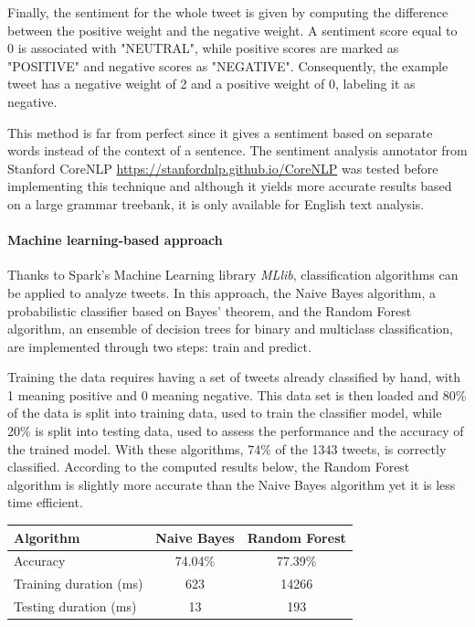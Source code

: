 \documentclass[11pt]{article}
\begin{document}
Finally, the sentiment for the whole tweet is given by computing the difference between the positive weight and the negative weight. A sentiment score equal to 0 is associated with "NEUTRAL", while positive scores are marked as "POSITIVE" and negative scores as "NEGATIVE". Consequently, the example tweet has a negative weight of 2 and a positive weight of 0, labeling it as negative.

This method is far from perfect since it gives a sentiment based on separate words instead of the context of a sentence. The sentiment analysis annotator from Stanford CoreNLP \url{https://stanfordnlp.github.io/CoreNLP} was tested before implementing this technique and although it yields more accurate results based on a large grammar treebank, it is only available for English text analysis.

\paragraph{Machine learning-based approach}


Thanks to Spark's Machine Learning library \textit{MLlib}, classification algorithms can be applied to analyze tweets. In this approach, the Naive Bayes algorithm, a probabilistic classifier based on Bayes' theorem, and the Random Forest algorithm, an ensemble of decision trees for binary and multiclass classification, are implemented through two steps: train and predict.

Training the data requires having a set of tweets already classified by hand, with 1 meaning positive and 0 meaning negative. This data set is then loaded and 80\% of the data is split into training data, used to train the classifier model, while 20\% is split into testing data, used to assess the performance and the accuracy of the trained model.
With these algorithms, 74\% of the 1343 tweets, is correctly classified. According to the computed results below, the Random Forest algorithm is slightly more accurate than the Naive Bayes algorithm yet it is less time efficient. %

\begin{center}
\begin{tabular}{|l|c|c|}
  \hline
  Algorithm & Naive Bayes & Random Forest \\
  \hline
  Accuracy & 74.04\% & 77.39\% \\
  Training duration (ms) & 623 & 14266 \\
  Testing duration (ms) & 13 & 193 \\
  \hline
\end{tabular}
\end{center}
\end{document}
